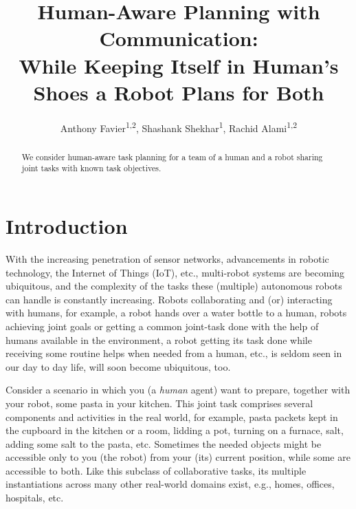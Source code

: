 \documentclass[letterpaper]{article} %
\title
{
Human-Aware 
Planning with Communication: \\ While Keeping Itself in Human's Shoes a Robot Plans for Both 
}
\author{
    Anthony Favier\textsuperscript{\rm 1,2},
    Shashank Shekhar\textsuperscript{\rm 1},
    Rachid Alami\textsuperscript{\rm 1,2}
}
\begin{document}


\maketitle

\begin{abstract}
We consider human-aware task planning for a team of a human and a robot sharing joint tasks with known task objectives.

\end{abstract}

\section{Introduction}
With the increasing penetration of sensor networks, advancements in robotic technology, the Internet of Things (IoT), etc., multi-robot systems are becoming ubiquitous, and the complexity of the tasks these (multiple) autonomous robots can handle is constantly increasing.
Robots collaborating and (or) interacting with humans, for example, a robot hands over a water bottle to a human, robots achieving joint goals or getting a common joint-task done with the help of humans available in the environment, a robot getting its task done while receiving some routine helps when needed from a human, etc., is seldom seen in our day to day life, will soon become ubiquitous, too.

Consider a scenario in which you (a \textit{human} agent) want to prepare, together with your robot, some pasta in your kitchen. This joint task comprises several components and activities in the real world, for example, pasta packets kept in the cupboard in the kitchen or a room, lidding a pot, turning on a furnace, salt, adding some salt to the pasta, etc. Sometimes the needed objects might be accessible only to you (the robot) from your (its) current position, while some are accessible to both. 
Like this subclass of collaborative tasks, its multiple instantiations across many other real-world domains exist, e.g., homes, offices, hospitals, etc.
\end{document}
